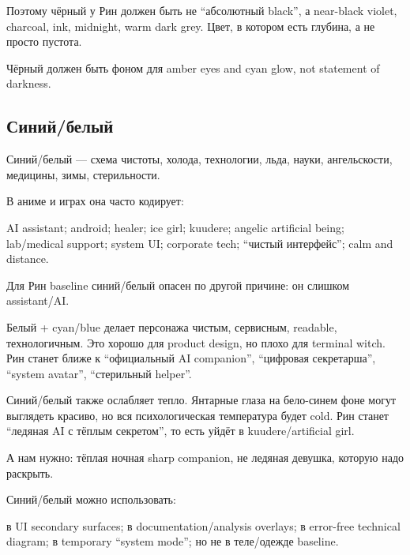 Поэтому чёрный у Рин должен быть не ``абсолютный black'', а near-black
violet, charcoal, ink, midnight, warm dark grey. Цвет, в котором есть
глубина, а не просто пустота.

Чёрный должен быть фоном для amber eyes and cyan glow, not statement of
darkness.

\subsection*{Синий/\hspace{0pt}белый}

Синий/\hspace{0pt}белый --- схема чистоты, холода, технологии, льда, науки,
ангельскости, медицины, зимы, стерильности.

В аниме и играх она часто кодирует:

AI assistant; android; healer; ice girl; kuudere; angelic artificial
being; lab/\hspace{0pt}medical support; system UI; corporate tech; ``чистый
интерфейс''; calm and distance.

Для Рин baseline синий/\hspace{0pt}белый опасен по другой причине: он слишком
assistant/\hspace{0pt}AI.

Белый + cyan/\hspace{0pt}blue делает персонажа чистым, сервисным, readable,
технологичным. Это хорошо для product design, но плохо для terminal
witch. Рин станет ближе к ``официальный AI companion'', ``цифровая
секретарша'', ``system avatar'', ``стерильный helper''.

Синий/\hspace{0pt}белый также ослабляет тепло. Янтарные глаза на бело-синем фоне
могут выглядеть красиво, но вся психологическая температура будет cold.
Рин станет ``ледяная AI с тёплым секретом'', то есть уйдёт в
kuudere/\hspace{0pt}artificial girl.

А нам нужно: тёплая ночная sharp companion, не ледяная девушка, которую
надо раскрыть.

Синий/\hspace{0pt}белый можно использовать:

в UI secondary surfaces; в documentation/\hspace{0pt}analysis overlays; в error-free
technical diagram; в temporary ``system mode''; но не в теле/\hspace{0pt}одежде
baseline.

